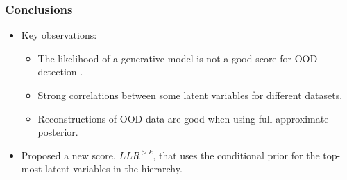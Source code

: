 \begin{frame}
    \frametitle{Conclusions}
    \begin{itemize}
        \item Key observations: 
        \begin{itemize}
            \item The likelihood of a generative model is not a good score for OOD detection \cite{nalisnick_deep_2019}.
            \item Strong correlations between some latent variables for different datasets.
            \item Reconstructions of OOD data are good when using full approximate posterior.
        \end{itemize}
        \item[\highlight{$\rightarrow$}] Proposed a new score, $LLR^{>k}$, that uses the conditional prior for the top-most latent variables in the hierarchy.
    \end{itemize}
\end{frame}

    


    

